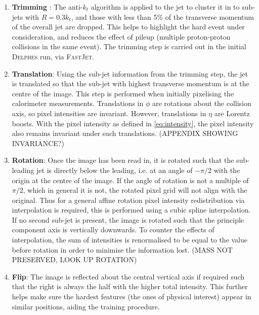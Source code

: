 \documentclass[twocolumn,twoside]{article}
\newcommand{\pkg}[1]{\textsc{#1}}
\begin{document}
\begin{enumerate}
	\item \textbf{Trimming} \cite{trimming}: The anti-$k_t$ algorithm is applied to the jet to cluster it in to sub-jets with $R = 0.3 k_t$, and those with less than 5\% of the transverse momentum of the overall jet are dropped. This helps to highlight the hard event under consideration, and reduces the effect of pileup (multiple proton-proton collisions in the same event). The trimming step is carried out in the initial \pkg{Delphes} run, via \pkg{FastJet}.
	
	
	\item \textbf{Translation}: Using the sub-jet information from the trimming step, the jet is translated so that the sub-jet with highest transverse momentum is at the centre of the image. This step is performed when initially pixelising the calorimeter measurements. Translations in $\phi$ are rotations about the collision axis, so pixel intensities are invariant. However, translations in $\eta$ are Lorentz boosts. With the pixel intensity as defined in \cref{eq:intensity}, the pixel intensity also remains invariant under such translations. (APPENDIX SHOWING INVARIANCE?)
	
	\item \textbf{Rotation}: Once the image has been read in, it is rotated such that the sub-leading jet is directly below the leading, i.e. at an angle of $-\pi/2$ with the origin at the centre of the image. If the angle of rotation is not a multiple of $\pi/2$, which in general it is not, the rotated pixel grid will not align with the original. Thus for a general affine rotation pixel intensity redistribution via interpolation is required, this is performed using a cubic spline interpolation. If no second sub-jet is present, the image is rotated such that the principle component axis is vertically downwards. To counter the effects of interpolation, the sum of intensities is renormalised to be equal to the value before rotation in order to minimise the information lost. (MASS NOT PRESERVED, LOOK UP ROTATION)
	
	\item \textbf{Flip}:  The image is reflected about the central vertical axis if required such that the right is always the half with the higher total intensity. This further helps make sure the hardest features (the ones of physical interest) appear in similar positions, aiding the training procedure. 
	
\end{enumerate}
\end{document}

